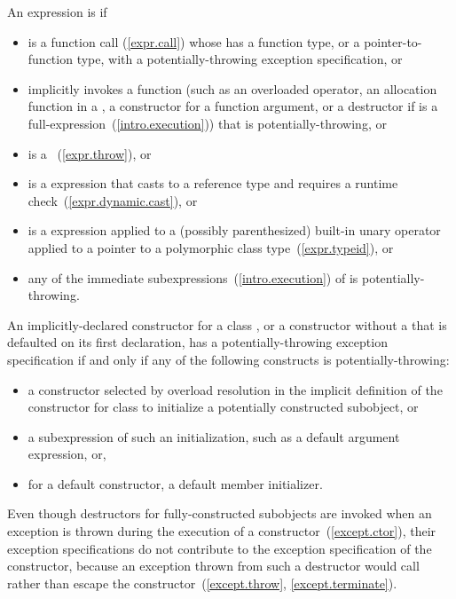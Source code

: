 \pnum
An expression  is
 if

\begin{itemize}
\item
{} is a function call (\ref{expr.call})
whose 
has a function type,
or a pointer-to-function type,
with a potentially-throwing exception specification,
or
\item
{} implicitly invokes a function
(such as an overloaded operator,
an allocation function in a ,
a constructor for a function argument,
or a destructor if  is a full-expression~(\ref{intro.execution}))
that is potentially-throwing,
or
\item
{} is a ~(\ref{expr.throw}),
or
\item
{} is a  expression that casts to a reference type and
requires a runtime check~(\ref{expr.dynamic.cast}),
or
\item
{} is a  expression applied to a
(possibly parenthesized) built-in unary \tcode{*} operator
applied to a pointer to a
polymorphic class type~(\ref{expr.typeid}),
or
\item
any of the immediate subexpressions~(\ref{intro.execution})
of  is potentially-throwing.
\end{itemize}

\pnum
An implicitly-declared constructor for a class ,
or a constructor without a 
that is defaulted on its first declaration,
has a potentially-throwing exception specification
if and only if
any of the following constructs is potentially-throwing:

\begin{itemize}
\item
a constructor selected by overload resolution
in the implicit definition of the constructor
for class 
to initialize a potentially constructed subobject, or
\item
a subexpression of such an initialization,
such as a default argument expression, or,
\item
for a default constructor, a default member initializer.
\end{itemize}
\begin{note}
Even though destructors for fully-constructed subobjects
are invoked when an exception is thrown
during the execution of a constructor~(\ref{except.ctor}),
their exception specifications do not contribute
to the exception specification of the constructor,
because an exception thrown from such a destructor
would call 
rather than escape the constructor~(\ref{except.throw}, \ref{except.terminate}).
\end{note}


